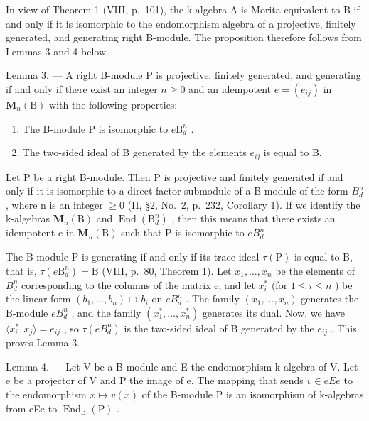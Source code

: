 In view of Theorem 1 (VIII, p.~101), the k-algebra A is Morita equivalent to B if and only if it is isomorphic to the endomorphism algebra of a projective, finitely generated, and generating right B-module. The proposition therefore follows from Lemmas 3 and 4 below.

Lemma 3. --- A right B-module P is projective, finitely generated, and generating if and only if there exist an integer \(n \geqslant 0\) and an idempotent \(e = (e_{ij})\) in \(\mathbf{M}_n(\mathrm{B})\) with the following properties:

\begin{enumerate}
\def\labelenumi{(\roman{enumi})}
\item
  The B-module P is isomorphic to \(e\mathrm{B}_d^n\) .
\item
  The two-sided ideal of B generated by the elements \(e_{ij}\) is equal to B.
\end{enumerate}

Let P be a right B-module. Then P is projective and finitely generated if and only if it is isomorphic to a direct factor submodule of a B-module of the form \(B_{d}^{n}\) , where n is an integer \(\geqslant 0\) (II, §2, No.~2, p.~232, Corollary 1). If we identify the k-algebras \(\mathbf{M}_{n}(\mathrm{B})\) and \(\operatorname{End}(\mathrm{B}_{d}^{n})\) , then this means that there exists an idempotent e in \(\mathbf{M}_{n}(\mathrm{B})\) such that P is isomorphic to \(eB_{d}^{n}\) .

The B-module P is generating if and only if its trace ideal \(\tau(\mathrm{P})\) is equal to B, that is, \(\tau(e\mathrm{B}_{d}^{n})=\mathrm{B}\) (VIII, p.~80, Theorem 1). Let \(x_{1},\ldots,x_{n}\) be the elements of \(B_{d}^{n}\) corresponding to the columns of the matrix e, and let \(x_{i}^{*}\) (for \(1\leqslant i\leqslant n\) ) be the linear form \((b_{1},\ldots,b_{n})\mapsto b_{i}\) on \(eB_{d}^{n}\) . The family \((x_{1},\ldots,x_{n})\) generates the B-module \(eB_{d}^{n}\) , and the family \((x_{1}^{*},\ldots,x_{n}^{*})\) generates its dual. Now, we have \(\langle x_{i}^{*},x_{j}\rangle=e_{ij}\) , so \(\tau(eB_{d}^{n})\) is the two-sided ideal of B generated by the \(e_{ij}\) . This proves Lemma 3.

Lemma 4. --- Let V be a B-module and E the endomorphism k-algebra of V. Let e be a projector of V and P the image of e. The mapping that sends \(v \in eEe\) to the endomorphism \(x \mapsto v(x)\) of the B-module P is an isomorphism of k-algebras from eEe to \(\operatorname{End}_{\mathrm{B}}(\mathrm{P})\) .

